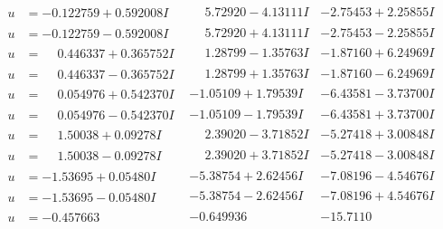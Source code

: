 \documentclass[1p]{elsarticle_modified}
\theoremstyle{definition}
\begin{document}
$$\begin{array}{c|c|c}
\begin{aligned}
u &= -0.122759 + 0.592008 I\end{aligned}
 & \phantom{-}5.72920 - 4.13111 I & -2.75453 + 2.25855 I \\ \hline\begin{aligned}
u &= -0.122759 - 0.592008 I\end{aligned}
 & \phantom{-}5.72920 + 4.13111 I & -2.75453 - 2.25855 I \\ \hline\begin{aligned}
u &= \phantom{-}0.446337 + 0.365752 I\end{aligned}
 & \phantom{-}1.28799 - 1.35763 I & -1.87160 + 6.24969 I \\ \hline\begin{aligned}
u &= \phantom{-}0.446337 - 0.365752 I\end{aligned}
 & \phantom{-}1.28799 + 1.35763 I & -1.87160 - 6.24969 I \\ \hline\begin{aligned}
u &= \phantom{-}0.054976 + 0.542370 I\end{aligned}
 & -1.05109 + 1.79539 I & -6.43581 - 3.73700 I \\ \hline\begin{aligned}
u &= \phantom{-}0.054976 - 0.542370 I\end{aligned}
 & -1.05109 - 1.79539 I & -6.43581 + 3.73700 I \\ \hline\begin{aligned}
u &= \phantom{-}1.50038 + 0.09278 I\end{aligned}
 & \phantom{-}2.39020 - 3.71852 I & -5.27418 + 3.00848 I \\ \hline\begin{aligned}
u &= \phantom{-}1.50038 - 0.09278 I\end{aligned}
 & \phantom{-}2.39020 + 3.71852 I & -5.27418 - 3.00848 I \\ \hline\begin{aligned}
u &= -1.53695 + 0.05480 I\end{aligned}
 & -5.38754 + 2.62456 I & -7.08196 - 4.54676 I \\ \hline\begin{aligned}
u &= -1.53695 - 0.05480 I\end{aligned}
 & -5.38754 - 2.62456 I & -7.08196 + 4.54676 I \\ \hline\begin{aligned}
u &= -0.457663\phantom{ +0.000000I}\end{aligned}
 & -0.649936\phantom{ +0.000000I} & -15.7110\phantom{ +0.000000I} \\ \hline\begin{aligned}

\end{aligned}
\end{array}$$
\end{document}
